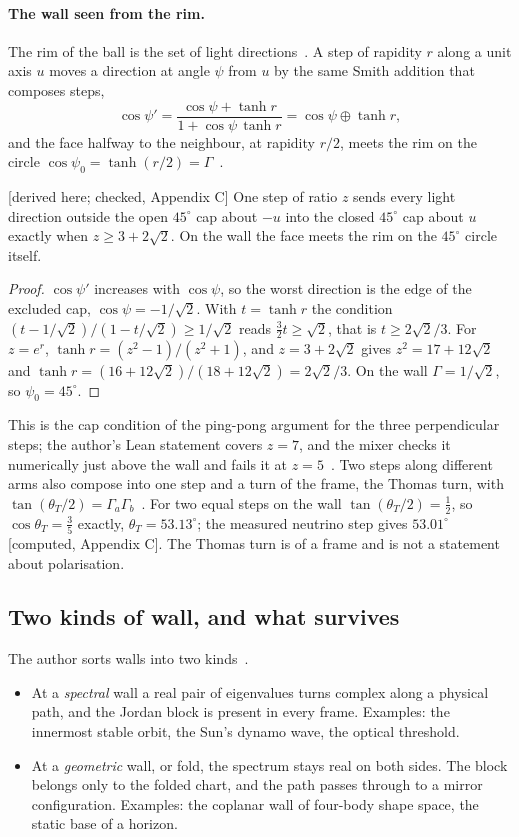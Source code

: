 \documentclass[11pt]{article}
\theoremstyle{definition}\newtheorem{hypothesis}{Hypothesis}\newtheorem{prediction}{Prediction}
\theoremstyle{remark}\newtheorem{remark}[theorem]{Remark}
\newcommand{\grade}[1]{\textsf{\small[#1]}}
\begin{document}
\paragraph{The wall seen from the rim.} The rim of the ball is the set of light directions~\cite{Mixer2}. A step of rapidity $r$ along a unit axis $u$ moves a direction at angle $\psi$ from $u$ by the same Smith addition that composes steps,
\begin{equation}
\cos\psi'=\frac{\cos\psi+\tanh r}{1+\cos\psi\,\tanh r}=\cos\psi\oplus\tanh r ,
\end{equation}
and the face halfway to the neighbour, at rapidity $r/2$, meets the rim on the circle $\cos\psi_0=\tanh(r/2)=\Gamma$~\cite{Mixer2}.
\begin{proposition}\label{prop:rim}\grade{derived here; checked, Appendix C}
One step of ratio $z$ sends every light direction outside the open $45^\circ$ cap about $-u$ into the closed $45^\circ$ cap about $u$ exactly when $z\ge3+2\sqrt2$. On the wall the face meets the rim on the $45^\circ$ circle itself.
\end{proposition}
\begin{proof}
$\cos\psi'$ increases with $\cos\psi$, so the worst direction is the edge of the excluded cap, $\cos\psi=-1/\sqrt2$. With $t=\tanh r$ the condition $(t-1/\sqrt2)/(1-t/\sqrt2)\ge1/\sqrt2$ reads $\tfrac32t\ge\sqrt2$, that is $t\ge2\sqrt2/3$. For $z=e^r$, $\tanh r=(z^2-1)/(z^2+1)$, and $z=3+2\sqrt2$ gives $z^2=17+12\sqrt2$ and $\tanh r=(16+12\sqrt2)/(18+12\sqrt2)=2\sqrt2/3$. On the wall $\Gamma=1/\sqrt2$, so $\psi_0=45^\circ$.
\end{proof}
This is the cap condition of the ping-pong argument for the three perpendicular steps; the author's Lean statement covers $z=7$, and the mixer checks it numerically just above the wall and fails it at $z=5$~\cite{Mixer2}. Two steps along different arms also compose into one step and a turn of the frame, the Thomas turn, with $\tan(\theta_T/2)=\Gamma_a\Gamma_b$~\cite{TwoTrees,Mixer2}. For two equal steps on the wall $\tan(\theta_T/2)=\tfrac12$, so $\cos\theta_T=\tfrac35$ exactly, $\theta_T=53.13^\circ$; the measured neutrino step gives $53.01^\circ$ \grade{computed, Appendix C}. The Thomas turn is of a frame and is not a statement about polarisation.

\subsection{Two kinds of wall, and what survives}
The author sorts walls into two kinds~\cite{BH}.
\begin{itemize}[nosep]
\item At a \emph{spectral} wall a real pair of eigenvalues turns complex along a physical path, and the Jordan block is present in every frame. Examples: the innermost stable orbit, the Sun's dynamo wave, the optical threshold.
\item At a \emph{geometric} wall, or fold, the spectrum stays real on both sides. The block belongs only to the folded chart, and the path passes through to a mirror configuration. Examples: the coplanar wall of four-body shape space, the static base of a horizon.
\end{itemize}
\end{document}
